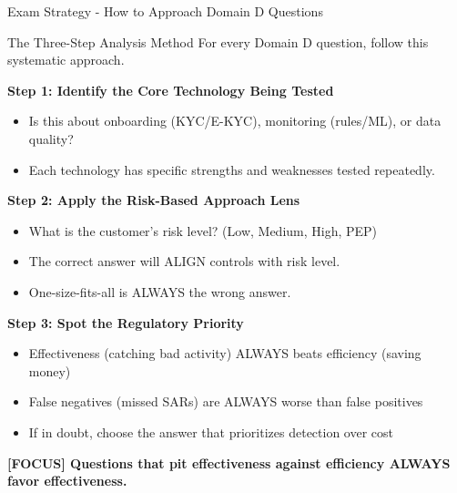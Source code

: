 \documentclass[11pt,a4paper]{beamer}
\newcommand{\examfocus}[1]{\textcolor{orange!80!black}{\textbf{[FOCUS] #1}}}
\begin{document}
	\begin{frame}{Exam Strategy - How to Approach Domain D Questions}
		\begin{block}{The Three-Step Analysis Method}
			For every Domain D question, follow this systematic approach.
		\end{block}
		
		\textbf{Step 1: Identify the Core Technology Being Tested}
		\begin{itemize}
			\item Is this about onboarding (KYC/E-KYC), monitoring (rules/ML), or data quality?
			\item Each technology has specific strengths and weaknesses tested repeatedly.
		\end{itemize}
		
		\textbf{Step 2: Apply the Risk-Based Approach Lens}
		\begin{itemize}
			\item What is the customer's risk level? (Low, Medium, High, PEP)
			\item The correct answer will ALIGN controls with risk level.
			\item One-size-fits-all is ALWAYS the wrong answer.
		\end{itemize}
		
		\textbf{Step 3: Spot the Regulatory Priority}
		\begin{itemize}
			\item Effectiveness (catching bad activity) ALWAYS beats efficiency (saving money)
			\item False negatives (missed SARs) are ALWAYS worse than false positives
			\item If in doubt, choose the answer that prioritizes detection over cost
		\end{itemize}
		
		\examfocus{Questions that pit effectiveness against efficiency ALWAYS favor effectiveness.}
	\end{frame}
	
\end{document}
